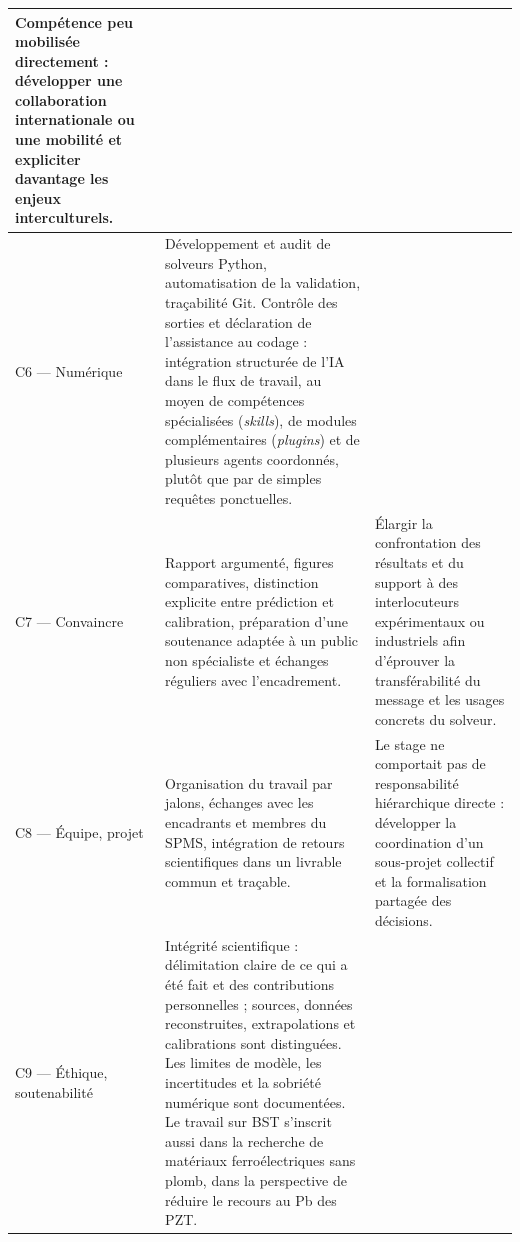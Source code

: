\begin{longtable}{p{}p{}p{}}
Compétence peu mobilisée directement : développer une collaboration
internationale ou une mobilité et expliciter davantage les enjeux
interculturels. \\
\hline
C6 --- Numérique &
Développement et audit de solveurs Python, automatisation de la validation,
traçabilité Git. Contrôle des sorties et déclaration de l'assistance au codage :
intégration structurée de l'IA dans le flux de travail, au moyen de compétences
spécialisées (\emph{skills}), de modules complémentaires (\emph{plugins}) et de
plusieurs agents coordonnés, plutôt que par de simples requêtes ponctuelles.
& \\
\hline
C7 --- Convaincre &
Rapport argumenté, figures comparatives, distinction explicite entre prédiction
et calibration, préparation d'une soutenance adaptée à un public non spécialiste
et échanges réguliers avec l'encadrement. &
Élargir la confrontation des résultats et du support à des interlocuteurs
expérimentaux ou industriels afin d'éprouver la transférabilité du message et
les usages concrets du solveur. \\
\hline
C8 --- Équipe, projet &
Organisation du travail par jalons, échanges avec les encadrants et membres du
SPMS, intégration de retours scientifiques dans un livrable commun et
traçable. &
Le stage ne comportait pas de responsabilité hiérarchique directe : développer
la coordination d'un sous-projet collectif et la formalisation partagée des
décisions. \\
\hline
C9 --- Éthique, soutenabilité &
Intégrité scientifique : délimitation claire de ce qui a été fait et des
contributions personnelles ; sources, données reconstruites, extrapolations et
calibrations sont distinguées. Les limites de modèle, les incertitudes et la
sobriété numérique sont documentées. Le travail sur BST s'inscrit aussi dans la
recherche de matériaux ferroélectriques sans plomb, dans la perspective de
réduire le recours au Pb des PZT. & \\
\hline
\end{longtable}
\endgroup
